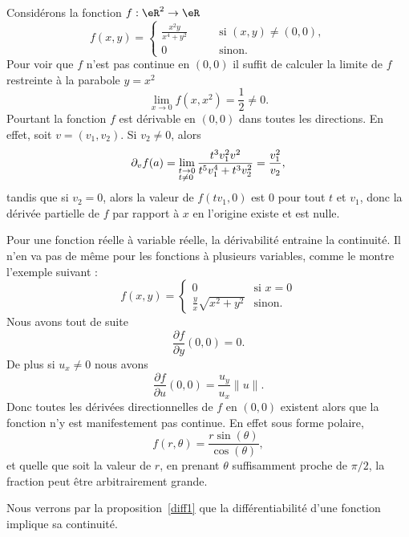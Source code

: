   \begin{example}
    Considérons la fonction $f:\eR^2\to \eR$
    \begin{equation}
      f(x,y)=\left\{
      \begin{array}{ll}
        \frac{x^2y}{x^4+y^2} \qquad&\textrm{si } (x,y)\neq (0,0),\\
        0     & \textrm{sinon}.
      \end{array}
      \right.
    \end{equation}
Pour voir que $f$ n'est pas continue en $(0,0)$ il suffit de calculer la limite de $f$ restreinte à la parabole $y=x^2$
\[
\lim_{x\to 0} f(x,x^2)=\frac{1}{2} \neq 0.
\]
Pourtant la fonction $f$ est dérivable en $(0,0)$ dans toutes les directions. En effet, soit $v=(v_1,v_2)$. Si $v_2\neq 0$, alors
\[
\partial_v f(a)=\lim_{\begin{subarray}{l}
			t\to 0\\ t\neq 0
  		\end{subarray}}
  		\frac{t^3v_1^2v^2}{t^5 v_1^4+ t^3v_2^2}=\frac{v_1^2}{v_2},
\]
tandis que si $v_2=0$, alors la valeur de $f(tv_1, 0)$  est $0$ pour tout $t$ et $v_1$, donc la dérivée partielle de $f$ par rapport à $x$ en l'origine existe et est nulle.
\end{example}

\begin{example}
    Pour une fonction réelle à variable réelle, la dérivabilité entraine la continuité. Il n'en va pas de même pour les fonctions à plusieurs variables, comme le montre l'exemple suivant :
    \begin{equation}
        f(x,y)=\begin{cases}
            0    &   \text{si } x=0\\
            \frac{ y }{ x }\sqrt{x^2+y^2}    &    \text{sinon.}
        \end{cases}
    \end{equation}
    Nous avons tout de suite
    \begin{equation}
        \frac{ \partial f }{ \partial y }(0,0)=0.
    \end{equation}
    De plus si \( u_x\neq 0\) nous avons
    \begin{equation}
            \frac{ \partial f }{ \partial u }(0,0)=\frac{ u_y }{ u_x }\| u \|.
    \end{equation}
    Donc toutes les dérivées directionnelles de \( f\) en \( (0,0)\) existent alors que la fonction n'y est manifestement pas continue. En effet sous forme polaire,
    \begin{equation}
        f(r,\theta)=\frac{ r\sin(\theta) }{ \cos(\theta) },
    \end{equation}
    et quelle que soit la valeur de \( r\), en prenant \( \theta\) suffisamment proche de \( \pi/2\), la fraction peut être arbitrairement grande.

    Nous verrons par la proposition~\ref{diff1} que la différentiabilité d'une fonction implique sa continuité.
\end{example}

